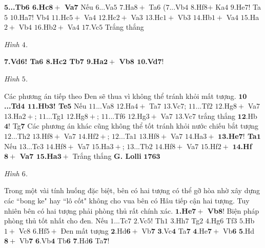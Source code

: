 \begin{multicols}{2}
	\vskip 0.1cm
	$\pmb{5}$\textbf{\color{gocco}...Tb$\pmb{6}$ $\pmb{6}$.Hc$\pmb{8+}$ Va}$\pmb{7}$ Nếu $6$...Va$5$ $7$.Ha$8+$ Ta$6$ ($7$...Vb$4$ $8$.Hf8$+$  Ka$4$ $9$.He$7!$ Ta$5$ $10$.Ha$7!$ Vb$4$ $11$.Hc$5+$ Va$4$ $12$.Hc$2+$ Va$3$ $13$.Hc$1+$ Vb$3$ $14$.Hb$1+$ Va$4$ $15$.Ha$2+$ Vb$4$ $16$.Hb$2+$ Va$4$ $17$.Vc$5$
	 \vskip 0.1cm
	Trắng thắng 
	\begin{center}
		\newgame
		\scalebox{0.95}\showboard
		\vskip 0.1cm
		\textit{\small\color{gocco}Hình $4$.}
	\end{center}
	$\pmb{7}$\textbf{\color{gocco}.Vd$\pmb{6}$! Ta$\pmb{6}$ $\pmb{8}$.Hc$\pmb{2}$ Tb$\pmb{7}$ $\pmb{9}$.Ha$\pmb{2+}$ Vb$\pmb{8}$ $\pmb{10}$.Vd}$\pmb{7!}$ 
	\begin{center}
		\newgame
		\scalebox{0.95}\showboard
		\vskip 0.1cm
		\textit{\small\color{gocco}Hình $5$.}
	\end{center}
	Các phương án tiếp theo Đen sẽ thua vì không thể tránh khỏi mất tượng.
	\vskip 0.1cm
	$\pmb{10}$\textbf{\color{gocco}...Td$\pmb{4}$ $\pmb{11}$.Hb$\pmb{3}$! Te$\pmb{5}$} Nếu $11$...Va$8$ $12$.Ha$4+$ Ta$7$ $13$.Vc$7$; $11$...Tf$2$ $12$.Hg$8+$ Va$7$ $13$.Ha$2+$; $11$...Tg$1$ $12$.Hg$8+$; $11$...Tf$6$ $12$.Hg$3+$ Va$7$ $13$.Vc$7$ trắng thắng
	\vskip 0.1cm
	$\pmb{12}$.Hb$\pmb{4!}$ Tg$\pmb{7}$ Các phương án khác cũng không thể tốt tránh khỏi nước chiếu bắt tượng $12$...Th$2$ $13$.Hf$8+$ Va$7$ $14$.Hf$2+$; $12$...Ta$1$ $13$.Hf$8+$ Va$7$ $14$.Ha$3+$
	\vskip 0.1cm
	$\pmb{13}$\textbf{\color{gocco}.He$\pmb{7!}$ Ta}$\pmb{1}$  Nếu $13$...Tc$3$ $14$.Hf$8+$ Va$7$ $15$.Ha$3+$; $13$...Tb$2$ $14$.Hf$8+$ Va$7$ $15$.Hf$2+$
	\vskip 0.1cm
	$\pmb{14}$\textbf{\color{gocco}.Hf$\pmb{8+}$ Va$\pmb{7}$ $\pmb{15}$.Ha}$\pmb{3+}$ Trắng thắng
	\vskip 0.1cm
	\textbf{\color{gocco}G. Lolli} $\pmb{1763}$
	\begin{center}
		\newgame
		\scalebox{0.95}\showboard
		\vskip 0.1cm
		\textit{\small\color{gocco}Hình $6$.}
	\end{center}
	Trong một vài tính huống đặc biệt, bên có hai tượng có thể gỡ hòa nhờ xây dựng các ``bong ke" hay ``lô cốt" không cho vua bên có Hâu tiếp cận hai tượng. Tuy nhiên bên có hai tượng phải phòng thủ rất chính xác.
	\vskip 0.1cm
	$\pmb{1}$\textbf{\color{gocco}.He$\pmb{7+}$ Vb}$\pmb{8!}$ Biện pháp phòng thủ tốt nhất cho đen.
	\vskip 0.1cm
	Nếu $1$...Tc$7$ $2$.Vc$5$! Th$1$ $3$.Hh$7$ Tg$2$ $4$.Hg$6$ Tf$3$ $5$.Hb$1+$ Vc$8$ $6$.Hf$5+$ Đen mất tượng
	\vskip 0.1cm
	$\pmb{2.}$Hd$\pmb{6+}$ Vb$\pmb{7}$ $\pmb{3}$.Vc$\pmb{4}$ Ta$\pmb{7}$ $\pmb{4}$.He$\pmb{7+}$ Vb$\pmb{6}$ $\pmb{5}$.Hd$\pmb{8+}$ Vb$\pmb{7}$ $\pmb{6}$.Vb$\pmb{4}$ Tb$\pmb{6}$ $\pmb{7}$.Hd$\pmb{6}$ Ta$\pmb{7!}$

\end{multicols}
